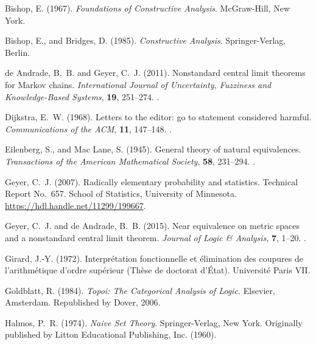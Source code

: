 \documentclass[11pt]{article}
\begin{document}
\begin{thebibliography}{}
Bishop, E. (1967).
\newblock \emph{Foundations of Constructive Analysis}.
\newblock McGraw-Hill, New York.

Bishop, E., and Bridges, D. (1985).
\newblock \emph{Constructive Analysis}.
\newblock Springer-Verlag, Berlin.

de Andrade, B.~B. and Geyer, C.~J. (2011).
\newblock Nonstandard central limit theorems for Markov chains.
\newblock \emph{International Journal of Uncertainty, Fuzziness and
    Knowledge-Based Systems}, \textbf{19}, 251--274.
\newblock {}.

Dijkstra, E.~W. (1968).
\newblock Letters to the editor: go to statement considered harmful.
\newblock \emph{Communications of the ACM}, \textbf{11}, 147--148.
\newblock {}.

Eilenberg, S., and Mac Lane, S. (1945).
\newblock General theory of natural equivalences.
\newblock \emph{Transactions of the American Mathematical Society},
    \textbf{58}, 231--294.
\newblock {}.

Geyer, C.~J. (2007).
\newblock Radically elementary probability and statistics.
\newblock Technical Report No.~657.  School of Statistics,
    University of Minnesota.
\newblock \url{https://hdl.handle.net/11299/199667}.

Geyer, C.~J. and de Andrade, B.~B. (2015).
\newblock Near equivalence on metric spaces and a nonstandard central
    limit theorem.
\newblock \emph{Journal of Logic \& Analysis}, \textbf{7}, 1--20.
\newblock {}.

Girard, J.-Y. (1972).
\newblock Interpr\'{e}tation fonctionnelle et \'{e}limination des coupures
    de l'arithmétique d'ordre sup\'{e}rieur (Th\`{e}se de doctorat d'\'{E}tat).
    Université Paris VII.

Goldblatt, R. (1984).
\newblock \emph{Topoi: The Categorical Analysis of Logic.}
\newblock Elsevier, Amsterdam.  Republished by Dover, 2006.

Halmos, P.~R. (1974).
\newblock \emph{Naive Set Theory}.
\newblock Springer-Verlag, New York.
\newblock Originally published by Litton Educational Publishing, Inc. (1960).


\end{thebibliography}
\end{document}
